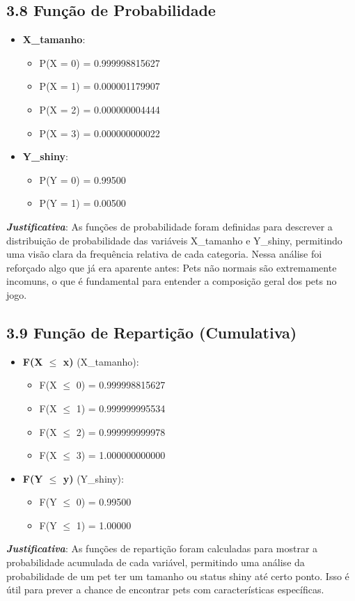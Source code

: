 \documentclass[12pt]{article}
\begin{document}
\subsection*{3.8 Função de Probabilidade}
\begin{itemize}
    \item \textbf{X\_tamanho}:
    \begin{itemize}
        \item P(X = 0) = 0.999998815627
        \item P(X = 1) = 0.000001179907
        \item P(X = 2) = 0.000000004444
        \item P(X = 3) = 0.000000000022
    \end{itemize}
    \item \textbf{Y\_shiny}:
    \begin{itemize}
        \item P(Y = 0) = 0.99500
        \item P(Y = 1) = 0.00500
    \end{itemize}
\end{itemize}
\textbf{\textit{Justificativa}}: As funções de probabilidade foram definidas para descrever a distribuição de probabilidade das variáveis X\_tamanho e Y\_shiny, permitindo uma visão clara da frequência relativa de cada categoria.
Nessa análise foi reforçado algo que já era aparente antes: Pets não normais são extremamente incomuns, o que é fundamental para entender a composição geral dos pets no jogo.

\subsection*{3.9 Função de Repartição (Cumulativa)}
\begin{itemize}
    \item \textbf{F(X $\leq$ x)} (X\_tamanho):
    \begin{itemize}
        \item F(X $\leq$ 0) = 0.999998815627
        \item F(X $\leq$ 1) = 0.999999995534
        \item F(X $\leq$ 2) = 0.999999999978
        \item F(X $\leq$ 3) = 1.000000000000
    \end{itemize}
    \item \textbf{F(Y $\leq$ y)} (Y\_shiny):
    \begin{itemize}
        \item F(Y $\leq$ 0) = 0.99500
        \item F(Y $\leq$ 1) = 1.00000
    \end{itemize}
\end{itemize}
\textbf{\textit{Justificativa}}: As funções de repartição foram calculadas para mostrar a probabilidade acumulada de cada variável, permitindo uma análise da probabilidade de um pet ter um tamanho ou status shiny até certo ponto. Isso é útil para prever a chance de encontrar pets com características específicas.
\end{document}
